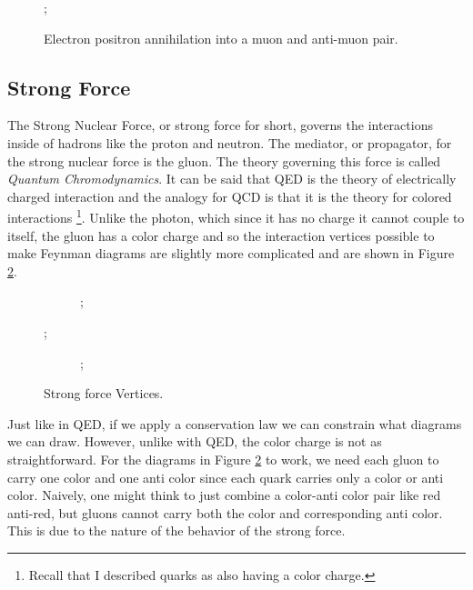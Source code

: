 \begin{figure} %
   \centering
      ;
   \caption{Electron positron annihilation into a muon and anti-muon pair.}
   \label{fig:fig_1-5}
\end{figure}

\subsection{Strong Force}

The Strong Nuclear Force, or strong force for short, governs the interactions inside of hadrons like the proton and neutron. The mediator, or propagator, for the strong nuclear force is the gluon. The theory governing this force is called \textit{Quantum Chromodynamics}.
It can be said that QED is the theory of electrically charged interaction and the analogy for QCD is that it is the theory for colored interactions \footnote{Recall that I described quarks as also having a color charge.}.
Unlike the photon, which since it has no charge it cannot couple to itself, the gluon has a color charge and so the interaction vertices possible to make Feynman diagrams are slightly more complicated and are shown in Figure \ref{fig:fig_1-6}.
\begin{figure} %
   \centering
   \begin{subfigure}[t]{0.49\textwidth}
      ;
   \end{subfigure}
   ;
   \begin{subfigure}[t]{0.49\textwidth}
      ;
   \end{subfigure}

   \caption{Strong force Vertices.}
   \label{fig:fig_1-6}
\end{figure}
Just like in QED, if we apply a conservation law we can constrain what diagrams we can draw. However, unlike with QED, the color charge is not as straightforward.
For the diagrams in Figure \ref{fig:fig_1-6} to work, we need each gluon to carry one color and one anti color since each quark carries only a color or anti color.
Naively, one might think to just combine a color-anti color pair like red anti-red, but gluons cannot carry both the color and corresponding anti color.
This is due to the nature of the behavior of the strong force. 

